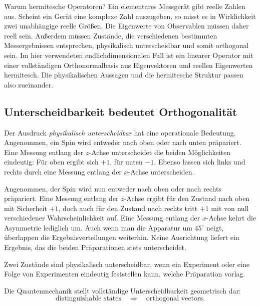Warum hermitesche Operatoren? Ein elementares Messgerät gibt reelle Zahlen aus. Scheint ein Gerät eine komplexe Zahl auszugeben, so misst es in Wirklichkeit zwei unabhängige reelle Größen. Die Eigenwerte von Observablen müssen daher reell sein. Außerdem müssen Zustände, die verschiedenen bestimmten Messergebnissen entsprechen, physikalisch unterscheidbar und somit orthogonal sein. Im hier verwendeten endlichdimensionalen Fall ist ein linearer Operator mit einer vollständigen Orthonormalbasis aus Eigenvektoren und reellen Eigenwerten hermitesch. Die physikalischen Aussagen und die hermitesche Struktur passen also zueinander.

\subsection{Unterscheidbarkeit bedeutet Orthogonalität}

Der Ausdruck \emph{physikalisch unterscheidbar} hat eine operationale Bedeutung. Angenommen, ein Spin wird entweder nach oben oder nach unten präpariert. Eine Messung entlang der \(z\)-Achse unterscheidet die beiden Möglichkeiten eindeutig: Für oben ergibt sich \(+1\), für unten \(-1\). Ebenso lassen sich links und rechts durch eine Messung entlang der \(x\)-Achse unterscheiden.

Angenommen, der Spin wird nun entweder nach oben oder nach rechts präpariert. Eine Messung entlang der \(z\)-Achse ergibt für den Zustand nach oben mit Sicherheit \(+1\), doch auch für den Zustand nach rechts tritt \(+1\) mit von null verschiedener Wahrscheinlichkeit auf. Eine Messung entlang der \(x\)-Achse kehrt die Asymmetrie lediglich um. Auch wenn man die Apparatur um \(45^\circ\) neigt, überlappen die Ergebnisverteilungen weiterhin. Keine Ausrichtung liefert ein Ergebnis, das die beiden Präparationen stets unterscheidet.

\begin{definition}
Zwei Zustände sind physikalisch unterscheidbar, wenn ein Experiment oder eine Folge von Experimenten eindeutig feststellen kann, welche Präparation vorlag.
\end{definition}

Die Quantenmechanik stellt vollständige Unterscheidbarkeit geometrisch dar:
\begin{equation}
\text{distinguishable states}
\quad\Longrightarrow\quad
\text{orthogonal vectors}.
\end{equation}

\begin{classroomqa}
\end{classroomqa}

